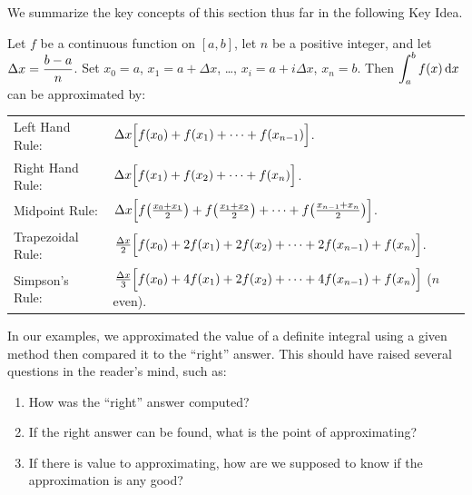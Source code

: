 We summarize the key concepts of this section thus far in the following Key Idea.

{
\begin{keyidea}\label{idea:numerical}%
Let $f$ be a continuous function on $[a,b]$, let $n$ be a positive integer, and let $\displaystyle\Delta x = \frac{b-a}{n}$.
Set $x_0=a$, $x_1=a+\Delta x$, \dots, $x_i = a+i\Delta x$, $x_n=b$.
Then $\displaystyle\int_a^b f(x)\operatorname{d}\! x$ can be approximated by:\\
%
%
%
%
%
%
%
%
%
%
%
%
\begin{tabular}{ll}
Left Hand Rule: &
$\Delta x\Bigl[f(x_0) + f(x_1) + \dotsb + f(x_{n-1})\Bigr]$.\\\addlinespace
Right Hand Rule: &
$\Delta x\Bigl[f(x_1) + f(x_2) + \dotsb + f(x_n)\Bigr]$.\\\addlinespace
Midpoint Rule: &
$\Delta x\Bigl[f\bigl(\frac{x_0+x_1}2\bigr) + f\bigl(\frac{x_1+x_2}2\bigr) + \dotsb + f\bigl(\frac{x_{n-1}+x_n}2\bigr)\Bigr]$.\\\addlinespace
Trapezoidal Rule: &
$\frac{\Delta x}2\Bigl[f(x_0) + 2f(x_1) + 2f(x_2) +\dotsb + 2f(x_{n-1})+ f(x_n)\Bigr]$.\\\addlinespace
Simpson's Rule: &
$\frac{\Delta x}3\Bigl[f(x_0) + 4f(x_1) + 2f(x_2) +\dotsb + 4f(x_{n-1})+ f(x_n)\Bigr]$ {\small ($n$ even)}.
\end{tabular}
\end{keyidea}
}

In our examples, we approximated the value of a definite integral using a given method then compared it to the ``right'' answer. This should have raised several questions in the reader's mind, such as:
\begin{enumerate}
	\item	How was the ``right'' answer computed?
	\item	If the right answer can be found, what is the point of approximating?
	\item	If there is value to approximating, how are we supposed to know if the approximation is any good?
\end{enumerate}

